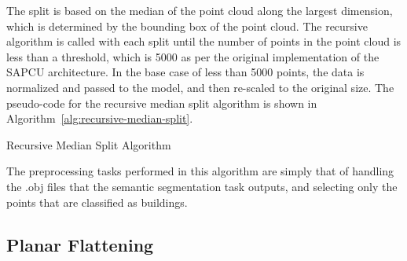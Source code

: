 \documentclass[10pt,twocolumn,letterpaper]{article}
\begin{document}
    The split is based on the median of the point cloud along the largest dimension, which is determined by the bounding box of the point cloud.
    The recursive algorithm is called with each split until the number of points in the point cloud is less than a threshold, which is 5000 as per the original implementation of the SAPCU architecture.
    In the base case of less than 5000 points, the data is normalized and passed to the model, and then re-scaled to the original size.
    The pseudo-code for the recursive median split algorithm is shown in Algorithm~\ref{alg:recursive-median-split}.

    \begin{algorithm}
        \caption{Recursive Median Split Algorithm}\label{alg:recursive-median-split}
        \DontPrintSemicolon
        
        \end{algorithm}
    

    The preprocessing tasks performed in this algorithm are simply that of handling the .obj files that the semantic segmentation task outputs, and selecting only the points that are classified as buildings.

    \subsection{Planar Flattening}\label{subsec:planar-flattening}
\end{document}
